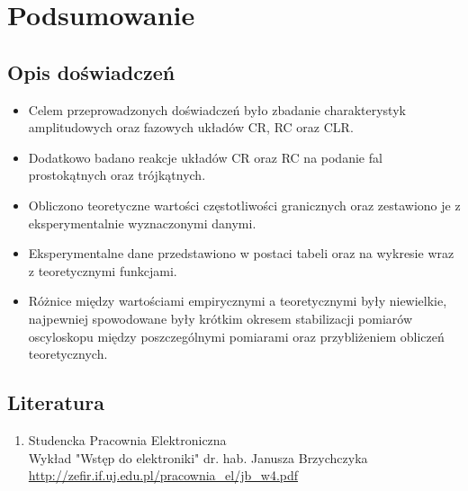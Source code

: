 \chapter{Podsumowanie}

\section{Opis doświadczeń}
\begin{itemize}
    \item Celem przeprowadzonych doświadczeń było zbadanie charakterystyk amplitudowych oraz fazowych układów CR, RC oraz CLR.
    \item Dodatkowo badano reakcje układów CR oraz RC na podanie fal prostokątnych oraz trójkątnych.
    \item Obliczono teoretyczne wartości częstotliwości granicznych oraz zestawiono je z eksperymentalnie wyznaczonymi danymi.
    \item Eksperymentalne dane przedstawiono w postaci tabeli oraz na wykresie wraz z teoretycznymi funkcjami.
    \item Różnice między wartościami empirycznymi a teoretycznymi były niewielkie, najpewniej spowodowane były krótkim okresem stabilizacji pomiarów oscyloskopu między poszczególnymi pomiarami oraz przybliżeniem obliczeń teoretycznych.
\end{itemize}

\section{Literatura}

\begin{enumerate}
    \item Studencka Pracownia Elektroniczna \\
    Wykład "Wstęp do elektroniki" dr. hab. Janusza Brzychczyka \\
    \url{http://zefir.if.uj.edu.pl/pracownia_el/jb_w4.pdf}
\end{enumerate}